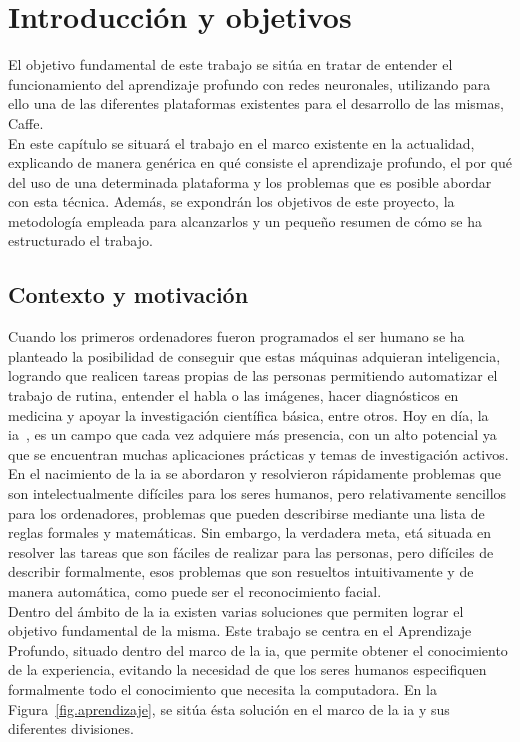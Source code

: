 \chapter{Introducción y objetivos}\label{cap.introduccion}
El objetivo fundamental de este trabajo se sitúa en tratar de entender el funcionamiento del aprendizaje profundo con redes neuronales, utilizando para ello una de las diferentes plataformas existentes para el desarrollo de las mismas, Caffe.\\

En este capítulo se situará el trabajo en el marco existente en la actualidad, explicando de manera genérica en qué consiste el aprendizaje profundo, el por qué del uso de una determinada plataforma y los problemas que es posible abordar con esta técnica. Además, se expondrán los objetivos de este proyecto, la metodología empleada para alcanzarlos y un pequeño resumen de cómo se ha estructurado el trabajo.

\section{Contexto y motivación}

Cuando los primeros ordenadores fueron programados el ser humano se ha planteado la posibilidad de conseguir que estas máquinas adquieran inteligencia, logrando que realicen tareas propias de las personas permitiendo automatizar el trabajo de rutina, entender el habla o las imágenes, hacer diagnósticos en medicina y apoyar la investigación científica básica, entre otros. Hoy en día, la \acrfull{ia}~\cite{Goodfellow-et-al-2016}, es un campo que cada vez adquiere más presencia, con un alto potencial ya que se encuentran muchas aplicaciones prácticas y temas de investigación activos.\\

En el nacimiento de la \acrshort{ia} se abordaron y resolvieron rápidamente problemas que son intelectualmente difíciles para los seres humanos, pero relativamente sencillos para los ordenadores, problemas que pueden describirse mediante una lista de reglas formales y matemáticas. Sin embargo, la verdadera meta, etá situada en resolver las tareas que son fáciles de realizar para las personas, pero difíciles de describir formalmente, esos problemas que son resueltos intuitivamente y de manera automática, como puede ser el reconocimiento facial.\\

Dentro del ámbito de la \acrshort{ia} existen varias soluciones que permiten lograr el objetivo fundamental de la misma. Este trabajo se centra en el Aprendizaje Profundo, situado dentro del marco de la \acrshort{ia}, que permite obtener el conocimiento de la experiencia, evitando la necesidad de que los seres humanos especifiquen formalmente todo el conocimiento que necesita la computadora. En la Figura~\ref{fig.aprendizaje}, se sitúa ésta solución en el marco de la \acrshort{ia} y sus diferentes divisiones.

